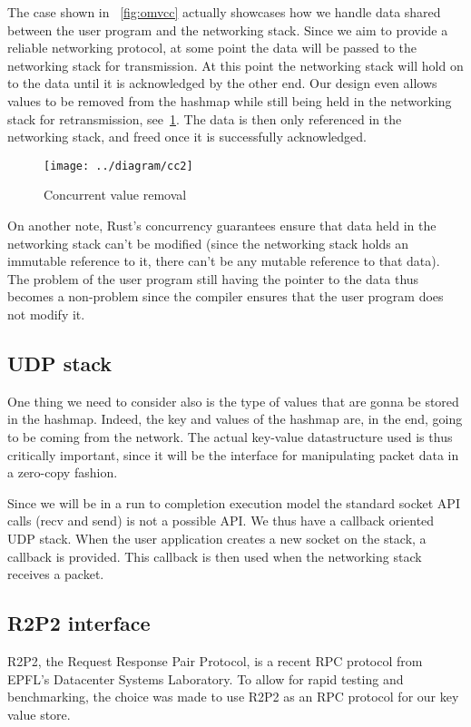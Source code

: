 \documentclass[11pt]{article}
\begin{document}
The case shown in ~\ref{fig:omvcc} actually showcases how we handle
data shared between the user program and the networking stack. Since
we aim to provide a reliable networking protocol, at some point the
data will be passed to the networking stack for transmission. At this
point the networking stack will hold on to the data until it is
acknowledged by the other end. Our design even allows values to be
removed from the hashmap while still being held in the networking
stack for retransmission, see~\ref{fig:cc2}. The data is then only
referenced in the networking stack, and freed once it is successfully
acknowledged.

\begin{figure}[h!]
  \texttt{[image: ../diagram/cc2]}
  \caption{Concurrent value removal}
  \label{fig:cc2}
\end{figure}

On another note, Rust's concurrency guarantees ensure that data held
in the networking stack can't be modified (since the networking stack
holds an immutable reference to it, there can't be any mutable
reference to that data). The problem of the user program still having
the pointer to the data thus becomes a non-problem since the compiler
ensures that the user program does not modify it.

\subsection{UDP stack}

One thing we need to consider also is the type of values that are
gonna be stored in the hashmap. Indeed, the key and values of the
hashmap are, in the end, going to be coming from the network. The
actual key-value datastructure used is thus critically important,
since it will be the interface for manipulating packet data in a
zero-copy fashion.

Since we will be in a run to completion execution model the standard
socket API calls (recv and send) is not a possible API. We thus have a
callback oriented UDP stack. When the user application creates a
new socket on the stack, a callback is provided. This callback is then
used when the networking stack receives a packet.

\subsection{R2P2 interface}

R2P2, the Request Response Pair Protocol, is a recent RPC protocol
from EPFL's Datacenter Systems Laboratory. To allow for rapid testing
and benchmarking, the choice was made to use R2P2 as an RPC protocol
for our key value store.
\end{document}
